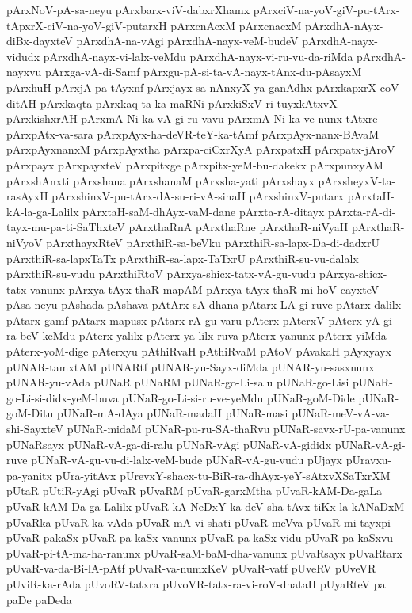 {pArxNoV-pA-sa-neyu
pArxbarx-viV-dabxrXhamx
pArxciV-na-yoV-giV-pu-tArx-tApxrX-ciV-na-yoV-giV-putarxH
pArxcnAcxM
pArxcnacxM
pArxdhA-nAyx-diBx-dayxteV
pArxdhA-na-vAgi
pArxdhA-nayx-veM-budeV
pArxdhA-nayx-vidudx
pArxdhA-nayx-vi-lalx-veMdu
pArxdhA-nayx-vi-ru-vu-da-riMda
pArxdhA-nayxvu
pArxga-vA-di-Samf
pArxgu-pA-si-ta-vA-nayx-tAnx-du-pAsayxM
pArxhuH
pArxjA-pa-tAyxnf
pArxjayx-sa-nAnxyX-ya-ganAdhx
pArxkapxrX-coV-ditAH
pArxkaqta
pArxkaq-ta-ka-maRNi
pArxkiSxV-ri-tuyxkAtxvX
pArxkishxrAH
pArxmA-Ni-ka-vA-gi-ru-vavu
pArxmA-Ni-ka-ve-nunx-tAtxre
pArxpAtx-va-sara
pArxpAyx-ha-deVR-teY-ka-tAmf
pArxpAyx-nanx-BAvaM
pArxpAyxnanxM
pArxpAyxtha
pArxpa-ciCxrXyA
pArxpatxH
pArxpatx-jAroV
pArxpayx
pArxpayxteV
pArxpitxge
pArxpitx-yeM-bu-dakekx
pArxpunxyAM
pArxshAnxti
pArxshana
pArxshanaM
pArxsha-yati
pArxshayx
pArxsheyxV-ta-rasAyxH
pArxshinxV-pu-tArx-dA-su-ri-vA-sinaH
pArxshinxV-putarx
pArxtaH-kA-la-ga-Lalilx
pArxtaH-saM-dhAyx-vaM-dane
pArxta-rA-ditayx
pArxta-rA-di-tayx-mu-pa-ti-SaThxteV
pArxthaRnA
pArxthaRne
pArxthaR-niVyaH
pArxthaR-niVyoV
pArxthayxRteV
pArxthiR-sa-beVku
pArxthiR-sa-lapx-Da-di-dadxrU
pArxthiR-sa-lapxTaTx
pArxthiR-sa-lapx-TaTxrU
pArxthiR-su-vu-dalalx
pArxthiR-su-vudu
pArxthiRtoV
pArxya-shicx-tatx-vA-gu-vudu
pArxya-shicx-tatx-vanunx
pArxya-tAyx-thaR-mapAM
pArxya-tAyx-thaR-mi-hoV-cayxteV
pAsa-neyu
pAshada
pAshava
pAtArx-sA-dhana
pAtarx-LA-gi-ruve
pAtarx-dalilx
pAtarx-gamf
pAtarx-mapusx
pAtarx-rA-gu-varu
pAterx
pAterxV
pAterx-yA-gi-ra-beV-keMdu
pAterx-yalilx
pAterx-ya-lilx-ruva
pAterx-yanunx
pAterx-yiMda
pAterx-yoM-dige
pAterxyu
pAthiRvaH
pAthiRvaM
pAtoV
pAvakaH
pAyxyayx
pUNAR-tamxtAM
pUNARtf
pUNAR-yu-Sayx-diMda
pUNAR-yu-sasxnunx
pUNAR-yu-vAda
pUNaR
pUNaRM
pUNaR-go-Li-salu
pUNaR-go-Lisi
pUNaR-go-Li-si-didx-yeM-buva
pUNaR-go-Li-si-ru-ve-yeMdu
pUNaR-goM-Dide
pUNaR-goM-Ditu
pUNaR-mA-dAya
pUNaR-madaH
pUNaR-masi
pUNaR-meV-vA-va-shi-SayxteV
pUNaR-midaM
pUNaR-pu-ru-SA-thaRvu
pUNaR-savx-rU-pa-vanunx
pUNaRsayx
pUNaR-vA-ga-di-ralu
pUNaR-vAgi
pUNaR-vA-gididx
pUNaR-vA-gi-ruve
pUNaR-vA-gu-vu-di-lalx-veM-bude
pUNaR-vA-gu-vudu
pUjayx
pUravxu-pa-yanitx
pUra-yitAvx
pUrevxY-shacx-tu-BiR-ra-dhAyx-yeY-sAtxvXSaTxrXM
pUtaR
pUtiR-yAgi
pUvaR
pUvaRM
pUvaR-garxMtha
pUvaR-kAM-Da-gaLa
pUvaR-kAM-Da-ga-Lalilx
pUvaR-kA-NeDxY-ka-deV-sha-tAvx-tiKx-la-kANaDxM
pUvaRka
pUvaR-ka-vAda
pUvaR-mA-vi-shati
pUvaR-meVva
pUvaR-mi-tayxpi
pUvaR-pakaSx
pUvaR-pa-kaSx-vanunx
pUvaR-pa-kaSx-vidu
pUvaR-pa-kaSxvu
pUvaR-pi-tA-ma-ha-ranunx
pUvaR-saM-baM-dha-vanunx
pUvaRsayx
pUvaRtarx
pUvaR-va-da-Bi-lA-pAtf
pUvaR-va-numxKeV
pUvaR-vatf
pUveRV
pUveVR
pUviR-ka-rAda
pUvoRV-tatxra
pUvoVR-tatx-ra-vi-roV-dhataH
pUyaRteV
pa
paDe
paDeda
}
